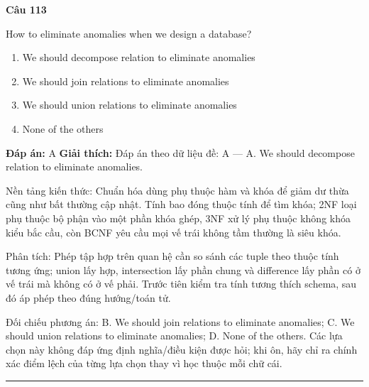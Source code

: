 \documentclass[11pt,a4paper]{article}
\newenvironment{question}[1]{%
  \par\vspace{1em}\noindent\textbf{\large Câu #1}\par\vspace{0.4em}
}{%
  \par\vspace{1em}\hrule\vspace{0.6em}
}
\newenvironment{choices}{%
  \begin{enumerate}[label=\textbf{\Alph*.},leftmargin=2.2em,itemsep=2pt,topsep=3pt]
}{%
  \end{enumerate}
}
\newcommand{\choice}{\item}
\begin{document}
\begin{question}{113}
How to eliminate anomalies when we design a database?
\begin{choices}
\choice We should decompose relation to eliminate anomalies
\choice We should join relations to eliminate anomalies
\choice We should union relations to eliminate anomalies
\choice None of the others
\end{choices}
\textbf{Đáp án:} A
\textbf{Giải thích:} Đáp án theo dữ liệu đề: A — A. We should decompose relation to eliminate anomalies.

Nền tảng kiến thức: Chuẩn hóa dùng phụ thuộc hàm và khóa để giảm dư thừa cũng như bất thường cập nhật. Tính bao đóng thuộc tính để tìm khóa; 2NF loại phụ thuộc bộ phận vào một phần khóa ghép, 3NF xử lý phụ thuộc không khóa kiểu bắc cầu, còn BCNF yêu cầu mọi vế trái không tầm thường là siêu khóa.

Phân tích: Phép tập hợp trên quan hệ cần so sánh các tuple theo thuộc tính tương ứng; union lấy hợp, intersection lấy phần chung và difference lấy phần có ở vế trái mà không có ở vế phải. Trước tiên kiểm tra tính tương thích schema, sau đó áp phép theo đúng hướng/toán tử.

Đối chiếu phương án: B. We should join relations to eliminate anomalies; C. We should union relations to eliminate anomalies; D. None of the others. Các lựa chọn này không đáp ứng định nghĩa/điều kiện được hỏi; khi ôn, hãy chỉ ra chính xác điểm lệch của từng lựa chọn thay vì học thuộc mỗi chữ cái.
\end{question}
\end{document}
